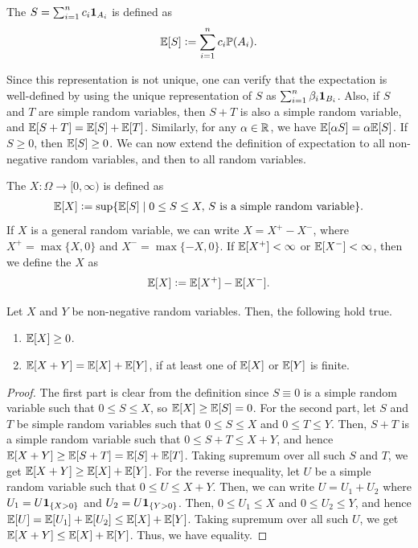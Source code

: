 \begin{definition}
    The  $S = \sum_{i=1}^{n} c_{i} \textbf{1}_{A_{i}}$ is defined as
    \begin{align}
        \mathbb{E}[S] \vcentcolon= \sum_{i=1}^{n} c_{i} \mathbb{P}(A_{i}).
    \end{align}
\end{definition}
Since this representation is not unique, one can verify that the expectation is well-defined by using the unique representation of $S$ as $\sum_{i=1}^{n} \beta_{i} \textbf{1}_{B_{i}}$. Also, if $S$ and $T$ are simple random variables, then $S+T$ is also a simple random variable, and $\mathbb{E}[S+T] = \mathbb{E}[S] + \mathbb{E}[T]$. Similarly, for any $\alpha \in \mathbb{R}$, we have $\mathbb{E}[\alpha S] = \alpha \mathbb{E}[S]$. If $S \geq 0$, then $\mathbb{E}[S] \geq 0$. We can now extend the definition of expectation to all non-negative random variables, and then to all random variables.

\begin{definition}
    The  $X: \Omega \to [0,\infty)$ is defined as
    \begin{align}
        \mathbb{E}[X] \vcentcolon= \sup\{\mathbb{E}[S] \mid 0 \leq S \leq X, \, S \text{ is a simple random variable}\}.
    \end{align}
    If $X$ is a general random variable, we can write $X = X^{+} - X^{-}$, where $X^{+} = \max\{X,0\}$ and $X^{-} = \max\{-X,0\}$. If $\mathbb{E}[X^{+}] < \infty$ or $\mathbb{E}[X^{-}] < \infty$, then we define the  $X$ as
    \begin{align}
        \mathbb{E}[X] \vcentcolon= \mathbb{E}[X^{+}] - \mathbb{E}[X^{-}].
    \end{align}
\end{definition}

\begin{proposition}
    Let $X$ and $Y$ be non-negative random variables. Then, the following hold true.
    \begin{enumerate}
        \item $\mathbb{E}[X] \geq 0$.
        \item $\mathbb{E}[X+Y] = \mathbb{E}[X] + \mathbb{E}[Y]$, if at least one of $\mathbb{E}[X]$ or $\mathbb{E}[Y]$ is finite.
    \end{enumerate}
\end{proposition}
\begin{proof}
    The first part is clear from the definition since $S \equiv 0$ is a simple random variable such that $0 \leq S \leq X$, so $\mathbb{E}[X] \geq \mathbb{E}[S] = 0$. For the second part, let $S$ and $T$ be simple random variables such that $0 \leq S \leq X$ and $0 \leq T \leq Y$. Then, $S+T$ is a simple random variable such that $0 \leq S+T \leq X+Y$, and hence $\mathbb{E}[X+Y] \geq \mathbb{E}[S+T] = \mathbb{E}[S] + \mathbb{E}[T]$. Taking supremum over all such $S$ and $T$, we get $\mathbb{E}[X+Y] \geq \mathbb{E}[X] + \mathbb{E}[Y]$. For the reverse inequality, let $U$ be a simple random variable such that $0 \leq U \leq X+Y$. Then, we can write $U = U_{1} + U_{2}$ where $U_{1} = U\textbf{1}_{\{X > 0\}}$ and $U_{2} = U\textbf{1}_{\{Y > 0\}}$. Then, $0 \leq U_{1} \leq X$ and $0 \leq U_{2} \leq Y$, and hence $\mathbb{E}[U] = \mathbb{E}[U_{1}] + \mathbb{E}[U_{2}] \leq \mathbb{E}[X] + \mathbb{E}[Y]$. Taking supremum over all such $U$, we get $\mathbb{E}[X+Y] \leq \mathbb{E}[X] + \mathbb{E}[Y]$. Thus, we have equality.
\end{proof}

